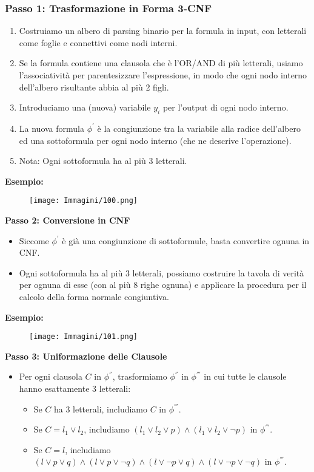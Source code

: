\documentclass{article}
\begin{document}
\subsubsection*{Passo 1: Trasformazione in Forma 3-CNF}
\begin{enumerate}
    \item Costruiamo un albero di parsing binario per la formula in input, con letterali come foglie e connettivi come nodi interni.
    \item Se la formula contiene una clausola che è l’OR/AND di più letterali, usiamo l’associatività per parentesizzare l’espressione, in modo che ogni nodo interno dell’albero risultante abbia al più 2 figli.
    \item Introduciamo una (nuova) variabile $y_i$ per l’output di ogni nodo interno.
    \item La nuova formula $\phi^{'}$ è la congiunzione tra la variabile alla radice dell’albero ed una sottoformula per ogni nodo interno (che ne descrive l’operazione).
    \item Nota: Ogni sottoformula ha al più 3 letterali.
\end{enumerate}
\newpage
\textbf{Esempio:}
\begin{figure}[H]
    \centering
    \texttt{[image: Immagini/100.png]}
    \label{fig:esempio-3-cnf}
\end{figure}

\textbf{Passo 2: Conversione in CNF}
\begin{itemize}
    \item Siccome $\phi^{'}$ è già una congiunzione di sottoformule, basta convertire ognuna in CNF.
    \item Ogni sottoformula ha al più 3 letterali, possiamo costruire la tavola di verità per ognuna di esse (con al più 8 righe ognuna) e applicare la procedura per il calcolo della forma normale congiuntiva.
\end{itemize}

\textbf{Esempio:}
\begin{figure}[H]
    \centering
    \texttt{[image: Immagini/101.png]}
    \label{fig:esempio-3-cnf}
\end{figure}

\textbf{Passo 3: Uniformazione delle Clausole}
\begin{itemize}
    \item Per ogni clausola $C$ in $\phi^{''}$, trasformiamo $\phi^{''}$ in $\phi^{'''}$ in cui tutte le clausole hanno esattamente 3 letterali:
    \begin{itemize}
        \item Se $C$ ha 3 letterali, includiamo $C$ in $\phi^{'''}$.
        \item Se $C = l_1 \lor l_2$, includiamo $(l_1 \lor l_2 \lor p) \land (l_1 \lor l_2 \lor \neg p)$ in $\phi^{'''}$.
        \item Se $C = l$, includiamo $(l \lor p \lor q) \land (l \lor p \lor \neg q) \land (l \lor \neg p \lor q) \land (l \lor \neg p \lor \neg q)$ in $\phi^{'''}$.
    \end{itemize}
\end{itemize}
\end{document}
